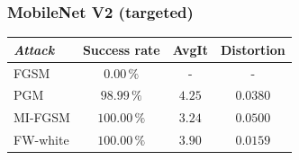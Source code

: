 \documentclass[10pt,twocolumn,letterpaper, english]{article}
\theoremstyle{definition}
\theoremstyle{plain}
\theoremstyle{plain}
\theoremstyle{plain}
\theoremstyle{plain}
\theoremstyle{remark}
\theoremstyle{remark}
\theoremstyle{definition}
\theoremstyle{definition}
\theoremstyle{definition}
\theoremstyle{definition}
\begin{document}
\subsubsection{MobileNet V2 (targeted)}

\begin{center}
    

\begin{tabular}{ |l|c|c|c| }
 \hline
  \textit{Attack} & Success rate & AvgIt & Distortion \\
 \hline
 
 FGSM   & $0.00\,\%$   &  - & -\\
 PGM&   $98.99\,\%$  & $4.25$  & $0.0380$ \\
 MI-FGSM & $100.00\,\%$ & $3.24$ & $0.0500$\\
 FW-white & $100.00\,\%$ & $3.90$ & $0.0159$\\
\hline
\end{tabular}
\end{center}
\end{document}
